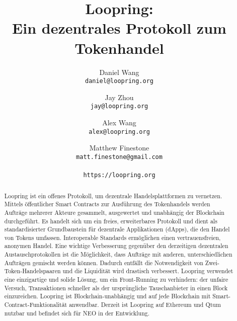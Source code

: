 \documentclass[UTF8,nofonts]{article}
\title{\textbf{Loopring:}\\\textbf{Ein dezentrales Protokoll zum Tokenhandel}}
\author{
 Daniel Wang\\
  \texttt{daniel@loopring.org}\\
  \and
  	Jay Zhou\\
  	\texttt{jay@loopring.org}\\
  	\and
  	Alex Wang\\
  	\texttt{alex@loopring.org}\\
  	\and
  	Matthew Finestone\\
  	\texttt{matt.finestone@gmail.com}\\ 
  \\
  \texttt{https://loopring.org}
 }
\begin{document}
\maketitle


\begin{abstract}
Loopring ist ein offenes Protokoll, um dezentrale Handelsplattformen zu vernetzen. Mittels öffentlicher Smart Contracts zur Ausführung des Tokenhandels werden Aufträge mehrerer Akteure gesammelt, ausgewertet und unabhängig der Blockchain durchgeführt. Es handelt sich um ein freies, erweiterbares Protokoll und dient als standardisierter Grundbaustein für dezentrale Applikationen (dApps), die den Handel von Tokens umfassen. Interoperable Standards ermöglichen einen vertrauensfreien, anonymen Handel. Eine wichtige Verbesserung gegenüber den derzeitigen dezentralen Austauschprotokollen ist die Möglichkeit, dass Aufträge mit anderen, unterschiedlichen Aufträgen gemischt werden können. Dadurch entfällt die Notwendigkeit von Zwei-Token-Handelspaaren und die Liquidität wird drastisch verbessert. Loopring verwendet eine einzigartige und solide Lösung, um ein Front-Running zu verhindern: der unfaire Versuch, Transaktionen schneller als der ursprüngliche Tauschanbieter in einen Block einzureichen. Loopring ist Blockchain-unabhängig und auf jede Blockchain mit Smart-Contract-Funktionalität anwendbar. Derzeit ist Loopring auf Ethereum \cite{buterin2017ethereum} \cite{wood2014ethereum} und Qtum \cite{dai2017smart} nutzbar und befindet sich für NEO \cite{atterlonn2018distributed} in der Entwicklung.
\end{abstract}
\end{document}
